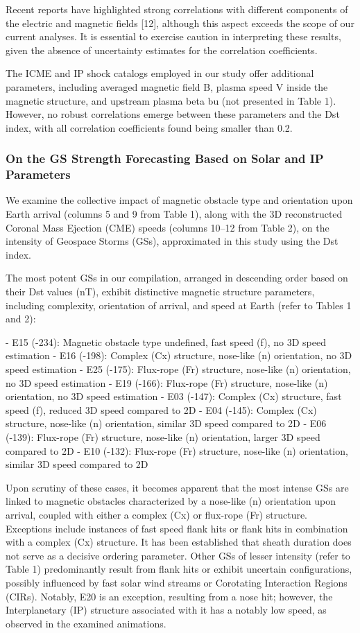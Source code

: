 Recent reports have highlighted strong correlations with different components of the electric and magnetic fields [12], although this aspect exceeds the scope of our current analyses. It is essential to exercise caution in interpreting these results, given the absence of uncertainty estimates for the correlation coefficients.

The ICME and IP shock catalogs employed in our study offer additional parameters, including averaged magnetic field B, plasma speed V inside the magnetic structure, and upstream plasma beta bu (not presented in Table 1). However, no robust correlations emerge between these parameters and the Dst index, with all correlation coefficients found being smaller than 0.2.

\subsubsection{On the GS Strength Forecasting Based on Solar and IP Parameters}
We examine the collective impact of magnetic obstacle type and orientation upon Earth arrival (columns 5 and 9 from Table 1), along with the 3D reconstructed Coronal Mass Ejection (CME) speeds (columns 10–12 from Table 2), on the intensity of Geospace Storms (GSs), approximated in this study using the Dst index.

The most potent GSs in our compilation, arranged in descending order based on their Dst values (nT), exhibit distinctive magnetic structure parameters, including complexity, orientation of arrival, and speed at Earth (refer to Tables 1 and 2):

- E15 (-234): Magnetic obstacle type undefined, fast speed (f), no 3D speed estimation
- E16 (-198): Complex (Cx) structure, nose-like (n) orientation, no 3D speed estimation
- E25 (-175): Flux-rope (Fr) structure, nose-like (n) orientation, no 3D speed estimation
- E19 (-166): Flux-rope (Fr) structure, nose-like (n) orientation, no 3D speed estimation
- E03 (-147): Complex (Cx) structure, fast speed (f), reduced 3D speed compared to 2D
- E04 (-145): Complex (Cx) structure, nose-like (n) orientation, similar 3D speed compared to 2D
- E06 (-139): Flux-rope (Fr) structure, nose-like (n) orientation, larger 3D speed compared to 2D
- E10 (-132): Flux-rope (Fr) structure, nose-like (n) orientation, similar 3D speed compared to 2D

Upon scrutiny of these cases, it becomes apparent that the most intense GSs are linked to magnetic obstacles characterized by a nose-like (n) orientation upon arrival, coupled with either a complex (Cx) or flux-rope (Fr) structure. Exceptions include instances of fast speed flank hits or flank hits in combination with a complex (Cx) structure. It has been established that sheath duration does not serve as a decisive ordering parameter. Other GSs of lesser intensity (refer to Table 1) predominantly result from flank hits or exhibit uncertain configurations, possibly influenced by fast solar wind streams or Corotating Interaction Regions (CIRs). Notably, E20 is an exception, resulting from a nose hit; however, the Interplanetary (IP) structure associated with it has a notably low speed, as observed in the examined animations.

